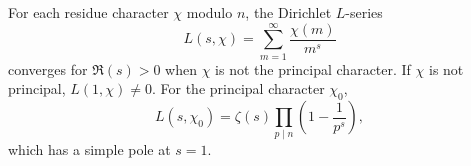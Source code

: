 For each residue character $\chi$ modulo $n$, the Dirichlet $L$-series
$$L(s, \chi) = \sum_{m=1}^{\infty} \frac{\chi(m)}{m^s}$$
converges for $\Re(s) > 0$ when $\chi$ is not the principal character. If $\chi$ is not principal, $L(1, \chi) \neq 0$. For the principal character $\chi_0$,
$$L(s, \chi_0) = \zeta(s) \prod_{p \mid n} \left(1 - \frac{1}{p^s}\right),$$
which has a simple pole at $s=1$.
